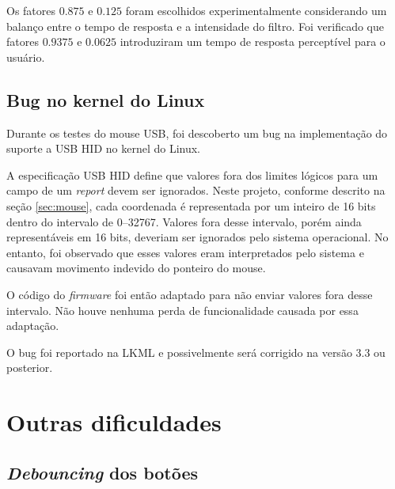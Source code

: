 \documentclass[brazil,pagestart=firstchapter]{abnt}
\begin{document}



Os fatores $0.875$ e $0.125$ foram escolhidos experimentalmente considerando
um balanço entre o tempo de resposta e a intensidade do filtro. Foi
verificado que fatores $0.9375$ e $0.0625$ introduziram um tempo de resposta
perceptível para o usuário.


\subsection{Bug no kernel do Linux}
\label{sub:linux_hid_bug}

Durante os testes do mouse \ac{USB}, foi descoberto um bug na implementação
do suporte a \ac{USB} \ac{HID} no kernel do Linux.

A especificação \ac{USB} \ac{HID} define que valores fora dos limites
lógicos para um campo de um \textit{report} devem ser ignorados.
\cite[p.~20]{usbhid} Neste projeto, conforme descrito na seção
\ref{sec:mouse}, cada coordenada é representada por um inteiro de 16 bits
dentro do intervalo de \numrange{0}{32767}. Valores fora desse intervalo,
porém ainda representáveis em 16 bits, deveriam ser ignorados pelo sistema
operacional. No entanto, foi observado que esses valores eram interpretados
pelo sistema e causavam movimento indevido do ponteiro do mouse.

O código do \textit{firmware} foi então adaptado para não enviar valores
fora desse intervalo. Não houve nenhuma perda de funcionalidade causada por
essa adaptação.

O bug foi reportado na \ac{LKML} \cite{LKMLhidnullvalues} e possivelmente
será corrigido na versão 3.3 ou posterior. \cite{LKMLhidnullvaluesResposta}


\section{Outras dificuldades}
\label{sec:outras_dificuldades}


\subsection{\textit{Debouncing} dos botões}
\label{sub:debouncing}
\end{document}

